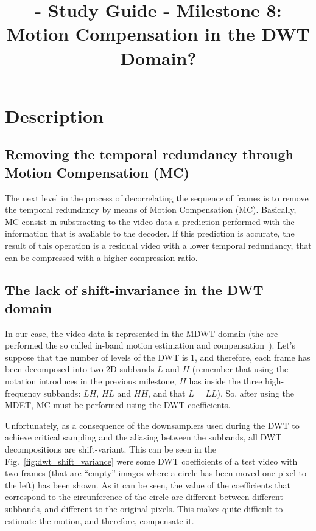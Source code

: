 
\title{\SM{} - Study Guide - Milestone 8: Motion Compensation in the DWT Domain?}

\maketitle

\section{Description}

\subsection{Removing the temporal redundancy through Motion Compensation (MC)}
The next level in the process of decorrelating the sequence of frames
is to remove the temporal redundancy by means of Motion Compensation
(MC). Basically, MC consist in substracting to the video data a
prediction performed with the information that is avaliable to the
decoder. If this prediction is accurate, the result of this operation
is a residual video with a lower temporal redundancy, that can be
compressed with a higher compression ratio.

\subsection{The lack of shift-invariance in the DWT domain}
In our case, the video data is represented in the MDWT domain (the are
performed the so called in-band motion estimation and
compensation~\cite{andreopoulos2005complete}). Let's suppose that the number of levels of the
DWT is 1, and therefore, each frame has been decomposed into two 2D
subbands $L$ and $H$ (remember that using the notation introduces in
the previous milestone, $H$ has inside the three high-frequency
subbands: $LH$, $HL$ and $HH$, and that $L=LL$). So, after using the
MDET, MC must be performed using the DWT coefficients.

Unfortunately, as a consequence of the downsamplers used during the
DWT to achieve critical sampling and the aliasing between the
subbands, all DWT decompositions are shift-variant. This can be seen
in the Fig.~\ref{fig:dwt_shift_variance} were some DWT coefficients of
a test video with two frames (that are ``empty'' images where a circle
has been moved one pixel to the left) has been shown. As it can be
seen, the value of the coefficients that correspond to the
circunference of the circle are different between different subbands,
and different to the original pixels. This makes quite difficult to
estimate the motion, and therefore, compensate it.

